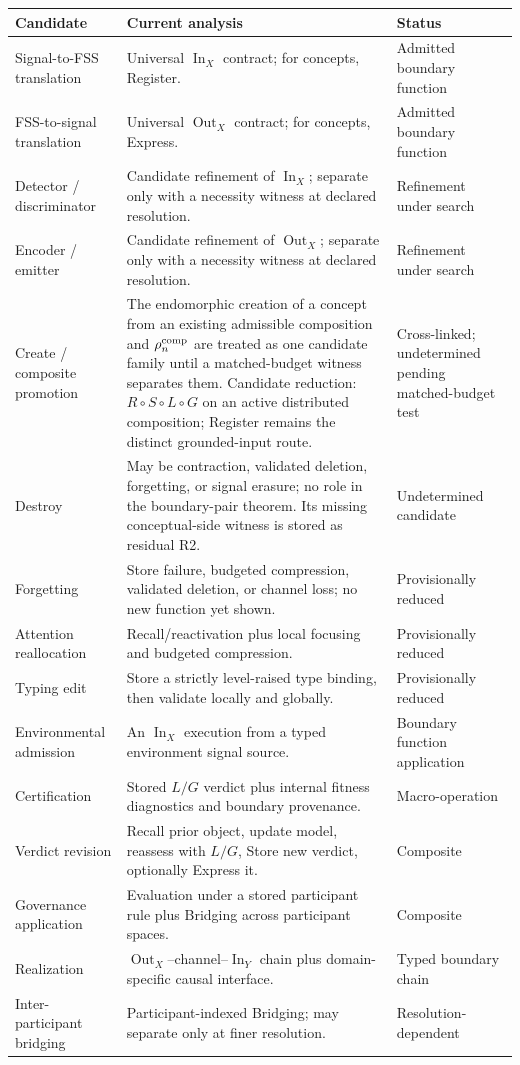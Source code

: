 \documentclass[11pt]{article}
\newcommand{\InOp}{\operatorname{In}}
\newcommand{\OutOp}{\operatorname{Out}}
\begin{document}
\begin{longtable}{p{}p{}p{}}
\toprule
\textbf{Candidate} & \textbf{Current analysis} & \textbf{Status}\\
\midrule\endhead
Signal-to-FSS translation & Universal $\InOp_X$ contract; for concepts, Register. & Admitted boundary function\\
FSS-to-signal translation & Universal $\OutOp_X$ contract; for concepts, Express. & Admitted boundary function\\
Detector / discriminator & Candidate refinement of $\InOp_X$; separate only with a necessity witness at declared resolution. & Refinement under search\\
Encoder / emitter & Candidate refinement of $\OutOp_X$; separate only with a necessity witness at declared resolution. & Refinement under search\\
Create / composite promotion & The endomorphic creation of a concept from an existing admissible composition and $\rho_n^{\rm comp}$ are treated as one candidate family until a matched-budget witness separates them. Candidate reduction: $R\circ S\circ L\circ G$ on an active distributed composition; Register remains the distinct grounded-input route. & Cross-linked; undetermined pending matched-budget test\\
Destroy & May be contraction, validated deletion, forgetting, or signal erasure; no role in the boundary-pair theorem. Its missing conceptual-side witness is stored as residual R2. & Undetermined candidate\\
Forgetting & Store failure, budgeted compression, validated deletion, or channel loss; no new function yet shown. & Provisionally reduced\\
Attention reallocation & Recall/reactivation plus local focusing and budgeted compression. & Provisionally reduced\\
Typing edit & Store a strictly level-raised type binding, then validate locally and globally. & Provisionally reduced\\
Environmental admission & An $\InOp_X$ execution from a typed environment signal source. & Boundary function application\\
Certification & Stored $L/G$ verdict plus internal fitness diagnostics and boundary provenance. & Macro-operation\\
Verdict revision & Recall prior object, update model, reassess with $L/G$, Store new verdict, optionally Express it. & Composite\\
Governance application & Evaluation under a stored participant rule plus Bridging across participant spaces. & Composite\\
Realization & $\OutOp_X$--channel--$\InOp_Y$ chain plus domain-specific causal interface. & Typed boundary chain\\
Inter-participant bridging & Participant-indexed Bridging; may separate only at finer resolution. & Resolution-dependent\\
\bottomrule
\end{longtable}
\end{document}
